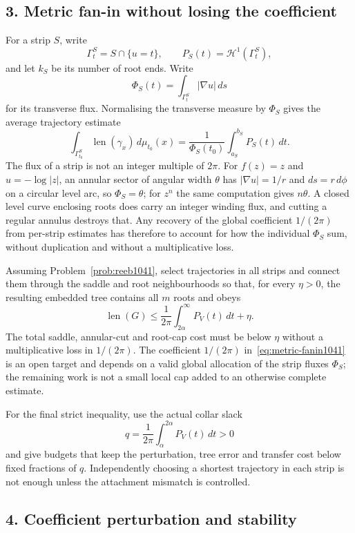 \subsection*{3. Metric fan-in without losing the coefficient}

For a strip $S$, write
\[
 \Gamma_t^S=S\cap\{u=t\},\qquad
 P_S(t)=\mathcal H^1(\Gamma_t^S),
\]
and let $k_S$ be its number of root ends.  Write
\[
 \Phi_S(t)=\int_{\Gamma_t^S}|\nabla u|\,ds
\]
for its transverse flux.  Normalising the transverse measure by $\Phi_S$ gives
the average trajectory estimate
\[
 \int_{\Gamma_{t_0}^S}\operatorname{len}(\gamma_x)\,d\mu_{t_0}(x)
 =
 \frac1{\Phi_S(t_0)}\int_{a_S}^{b_S}P_S(t)\,dt .
\]
The flux of a strip is not an integer multiple of $2\pi$.  For $f(z)=z$ and
$u=-\log|z|$, an annular sector of angular width $\theta$ has $|\nabla u|=1/r$
and $ds=r\,d\phi$ on a circular level arc, so $\Phi_S=\theta$; for $z^n$ the
same computation gives $n\theta$.  A closed level curve enclosing roots does
carry an integer winding flux, and cutting a regular annulus destroys that.
Any recovery of the global coefficient $1/(2\pi)$ from per-strip estimates has
therefore to account for how the individual $\Phi_S$ sum, without duplication
and without a multiplicative loss.

\begin{problem}\label{prob:metric1041}
Assuming Problem~\ref{prob:reeb1041}, select trajectories in all strips and
connect them through the saddle and root neighbourhoods so that, for every
$\eta>0$, the resulting embedded tree contains all $m$ roots and obeys
\[
 \operatorname{len}(G)
 \le\frac1{2\pi}\int_{2\alpha}^{\infty}P_V(t)\,dt+\eta.
\tag{6.1}\label{eq:metric-fanin1041}
\]
The total saddle, annular-cut and root-cap cost must be below $\eta$ without a
multiplicative loss in $1/(2\pi)$.  The coefficient $1/(2\pi)$
in~\eqref{eq:metric-fanin1041} is an open target and depends on a valid global
allocation of the strip fluxes $\Phi_S$; the remaining work is not a small
local cap added to an otherwise complete estimate.
\end{problem}

For the final strict inequality, use the actual collar slack
\[
 q=\frac1{2\pi}\int_{\alpha}^{2\alpha}P_V(t)\,dt>0
\]
and give budgets that keep the perturbation, tree error and transfer cost below
fixed fractions of $q$.  Independently choosing a shortest trajectory in each
strip is not enough unless the attachment mismatch is controlled.

\subsection*{4. Coefficient perturbation and stability}

